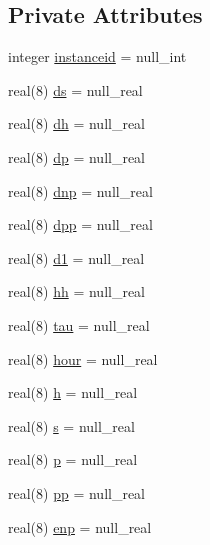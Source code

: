 \subsection*{Private Attributes}
\begin{DoxyCompactItemize}
\item 
integer \mbox{\hyperlink{structmoduletoga_1_1t__toga_a725f167e080364beffaf73593d9a03ce}{instanceid}} = null\+\_\+int
\item 
real(8) \mbox{\hyperlink{structmoduletoga_1_1t__toga_a75cc8fa0c0de82fa12501e6a5a4fd1ce}{ds}} = null\+\_\+real
\item 
real(8) \mbox{\hyperlink{structmoduletoga_1_1t__toga_a0f6c15821983995de4ca5bb9f9918d9c}{dh}} = null\+\_\+real
\item 
real(8) \mbox{\hyperlink{structmoduletoga_1_1t__toga_ab2a26f613a6fcc62252cd893860a950a}{dp}} = null\+\_\+real
\item 
real(8) \mbox{\hyperlink{structmoduletoga_1_1t__toga_a2c9d4304a42d6008d92afc73b913efee}{dnp}} = null\+\_\+real
\item 
real(8) \mbox{\hyperlink{structmoduletoga_1_1t__toga_ad7a799d7491a2b902fd0c6329dd883c2}{dpp}} = null\+\_\+real
\item 
real(8) \mbox{\hyperlink{structmoduletoga_1_1t__toga_a1866d08ac27cb8a407d0742aa69987da}{d1}} = null\+\_\+real
\item 
real(8) \mbox{\hyperlink{structmoduletoga_1_1t__toga_a25bfe4f9c1d2ec36711de7e403562b81}{hh}} = null\+\_\+real
\item 
real(8) \mbox{\hyperlink{structmoduletoga_1_1t__toga_a40771cb72a06c58f501fbaefc93cee38}{tau}} = null\+\_\+real
\item 
real(8) \mbox{\hyperlink{structmoduletoga_1_1t__toga_a0a6e56afc2d80bdcfb37c30e34ef881b}{hour}} = null\+\_\+real
\item 
real(8) \mbox{\hyperlink{structmoduletoga_1_1t__toga_aa6bf2b08c2280087045096cf47b6a07d}{h}} = null\+\_\+real
\item 
real(8) \mbox{\hyperlink{structmoduletoga_1_1t__toga_ab3cb5cbc5817996b68ab8237e5b1d10e}{s}} = null\+\_\+real
\item 
real(8) \mbox{\hyperlink{structmoduletoga_1_1t__toga_a8a93968c55eaa55b1ec28a08c0ee7c78}{p}} = null\+\_\+real
\item 
real(8) \mbox{\hyperlink{structmoduletoga_1_1t__toga_aa9c5c7f12e11bee3dfc2cac5d11eaf4e}{pp}} = null\+\_\+real
\item 
real(8) \mbox{\hyperlink{structmoduletoga_1_1t__toga_aab6cd83e32e5049410d6be2ee54e07f0}{enp}} = null\+\_\+real

\end{DoxyCompactItemize}
